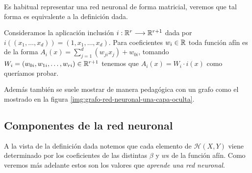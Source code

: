 \reversemarginpar
\setlength{\marginparwidth}{\smallMarginSize}
\normalmarginpar
\setlength{\marginparwidth}{\bigMarginSize}

\normalmarginpar
\setlength{\marginparwidth}{\bigMarginSize}


Es habitual representar una red neuronal de forma matricial, veremos que tal forma es equivalente a la definición dada. 

Consideramos la aplicación inclusión 
$i: \mathbb{R}^r \longrightarrow \mathbb{R}^{r+1}$ dada por 
 $i((x_1, \ldots, x_d)) = (1,x_1, \ldots, x_d).$
Para coeficientes $w_i \in \mathbb{R}$ toda función afín es de la forma 
$A_{i}(x)= \sum_{j=1}^d( w_{j i} x_j) + w_{0i}$, 
tomando $W_i = (w_{0 i}, w_{1 i}, \ldots, w_{r i}) \in \mathbb{R}^{r+1}$ tenemos que 
$A_i(x) = W_i \cdot i(x)$ como queríamos probar. 

Además también se suele mostrar de manera pedagógica con un grafo como el mostrado en la 
figura \ref{img:grafo-red-neuronal-una-capa-oculta}.


\subsection*{Componentes de la red neuronal}  

A la vista de la definición dada notemos que cada elemento de 
$\mathcal{H}(X,Y)$ viene determinado por los coeficientes 
de las distintas $\beta$ y  $w$s de la función afín. Como veremos más adelante estos son los valores que \textit{aprende una red neuronal}.

